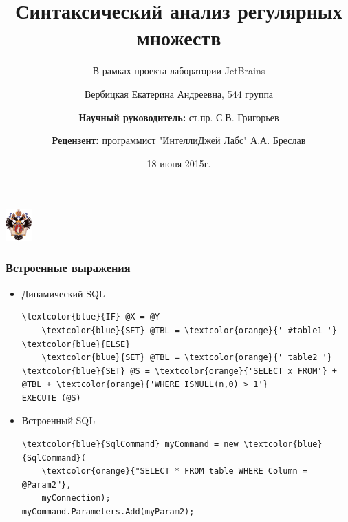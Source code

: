 \documentclass{beamer}
\title[]{Синтаксический анализ регулярных множеств}
\subtitle[]{В рамках проекта лаборатории JetBrains}
\institute[СПбГУ]{
Санкт-Петербургский государственный университет \\
Кафедра системного программирования }
\author[Вербицкая Екатерина]{Вербицкая Екатерина Андреевна, 544 группа \\
  \and  
    {\bfseries Научный руководитель:} ст.пр. С.В. Григорьев \\ 
  \and
    {\bfseries Рецензент:} программист "ИнтеллиДжей Лабс" А.А. Бреслав }
\date{18 июня 2015г.}
\begin{document}
{

\begin{frame}
  \begin{center}
  {\includegraphics[width=1cm]{SPbGU_Logo.png}}
  \end{center}
  \titlepage
\end{frame}
}

\begin{frame}[fragile]
  \transwipe[direction=90]
  \frametitle{Встроенные выражения}
  \begin{itemize}
    \item Динамический SQL
      \begin{Verbatim}[commandchars=\\\{\}]
\textcolor{blue}{IF} @X = @Y
    \textcolor{blue}{SET} @TBL = \textcolor{orange}{' #table1 '}
\textcolor{blue}{ELSE}
    \textcolor{blue}{SET} @TBL = \textcolor{orange}{' table2 '}
\textcolor{blue}{SET} @S = \textcolor{orange}{'SELECT x FROM'} + @TBL + \textcolor{orange}{'WHERE ISNULL(n,0) > 1'}
EXECUTE (@S)
       \end{Verbatim}
    \item Встроенный SQL
      \begin{Verbatim}[commandchars=\\\{\}]
\textcolor{blue}{SqlCommand} myCommand = new \textcolor{blue}{SqlCommand}(
    \textcolor{orange}{"SELECT * FROM table WHERE Column = @Param2"},
    myConnection);
myCommand.Parameters.Add(myParam2);
      \end{Verbatim}
    \end{itemize}
\end{frame}
\end{document}
